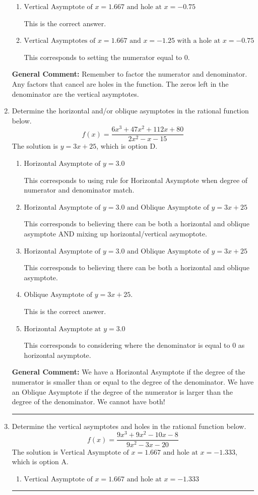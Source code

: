 \documentclass{extbook}[14pt]
\newcommand{\litem}[1]{\item #1

\rule{\textwidth}{0.4pt}}
\begin{document}
\begin{enumerate}
{\begin{enumerate}[label=\Alph*.]
This corresponds to considering where the denominator is equal to 0 as holes.
\item \( \text{Vertical Asymptote of } x = 1.667 \text{ and hole at } x = -0.75 \)

This is the correct answer.
\item \( \text{Vertical Asymptotes of } x = 1.667 \text{ and } x = -1.25 \text{ with a hole at } x = -0.75 \)

This corresponds to setting the numerator equal to 0.
\end{enumerate}

\textbf{General Comment:} Remember to factor the numerator and denominator. Any factors that cancel are holes in the function. The zeros left in the denominator are the vertical asymptotes.
}
\litem{
Determine the horizontal and/or oblique asymptotes in the rational function below.
\[ f(x) = \frac{6x^{3} +47 x^{2} +112 x + 80}{2x^{2} -x -15} \]The solution is \( y = 3x + 25 \), which is option D.\begin{enumerate}[label=\Alph*.]
\item \( \text{Horizontal Asymptote of } y = 3.0  \)

This corresponds to using rule for Horizontal Asymptote when degree of numerator and denominator match.
\item \( \text{Horizontal Asymptote of } y = 3.0 \text{ and Oblique Asymptote of } y = 3x + 25 \)

This corresponds to believing there can be both a horizontal and oblique asymptote AND mixing up horizontal/vertical asymoptote.
\item \( \text{Horizontal Asymptote of } y = 3.0 \text{ and Oblique Asymptote of } y = 3x + 25 \)

This corresponds to believing there can be both a horizontal and oblique asymptote.
\item \( \text{Oblique Asymptote of } y = 3x + 25. \)

This is the correct answer.
\item \( \text{Horizontal Asymptote at } y = 3.0 \)

This corresponds to considering where the denominator is equal to 0 as horizontal asymptote.
\end{enumerate}

\textbf{General Comment:} We have a Horizontal Asymptote if the degree of the numerator is smaller than or equal to the degree of the denominator. We have an Oblique Asymptote if the degree of the numerator is larger than the degree of the denominator. We cannot have both!
}
\litem{
Determine the vertical asymptotes and holes in the rational function below.
\[ f(x) = \frac{9x^{3} +9 x^{2} -10 x -8}{9x^{2} -3 x -20} \]The solution is \( \text{Vertical Asymptote of } x = 1.667 \text{ and hole at } x = -1.333 \), which is option A.\begin{enumerate}[label=\Alph*.]
\item \( \text{Vertical Asymptote of } x = 1.667 \text{ and hole at } x = -1.333 \)


\end{enumerate}}
\end{enumerate}
\end{document}
